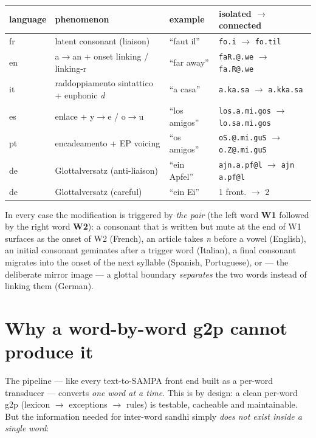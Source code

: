 \documentclass[11pt,a4paper]{report}
\newcommand{\smp}[1]{\texttt{#1}}          %
\begin{document}
\begin{center}\small
\begin{tabular}{@{}llll@{}}
\toprule
language & phenomenon & example & isolated $\rightarrow$ connected \\
\midrule
fr & latent consonant (liaison) & ``faut il'' & \smp{fo.i} $\rightarrow$ \smp{fo.til} \\
en & a$\rightarrow$an + onset linking / linking-r & ``far away'' & \smp{faR.@.we} $\rightarrow$ \smp{fa.R@.we} \\
it & raddoppiamento sintattico + euphonic \emph{d} & ``a casa'' & \smp{a.ka.sa} $\rightarrow$ \smp{a.kka.sa} \\
es & enlace + y$\rightarrow$e / o$\rightarrow$u & ``los amigos'' & \smp{los.a.mi.gos} $\rightarrow$ \smp{lo.sa.mi.gos} \\
pt & encadeamento + EP voicing & ``os amigos'' & \smp{oS.@.mi.guS} $\rightarrow$ \smp{o.Z@.mi.guS} \\
de & Glottalversatz (anti-liaison) & ``ein Apfel'' & \smp{ajn.a.pf@l} $\rightarrow$ \smp{ajn a.pf@l} \\
de & Glottalversatz (careful) & ``ein Ei'' & 1 front. $\rightarrow$ 2 \\
\bottomrule
\end{tabular}
\end{center}

In every case the modification is triggered by \emph{the pair} (the left word
\textbf{W1} followed by the right word \textbf{W2}): a consonant that is
written but mute at the end of W1 surfaces as the onset of W2 (French), an
article takes \emph{n} before a vowel (English), an initial consonant
geminates after a trigger word (Italian), a final consonant migrates into the
onset of the next syllable (Spanish, Portuguese), or — the deliberate mirror
image — a glottal boundary \emph{separates} the two words instead of linking
them (German).

\section{Why a word-by-word g2p cannot produce it}

The pipeline — like every text-to-SAMPA front end built as a per-word
transducer — converts \emph{one word at a time}. This is by design: a clean
per-word g2p (lexicon $\rightarrow$ exceptions $\rightarrow$ rules) is
testable, cacheable and maintainable. But the information needed for
inter-word sandhi simply \emph{does not exist inside a single word}:
\end{document}

